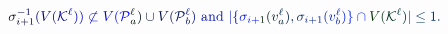 \documentclass[12pt]{article}
\begin{document}
\makeatletter
\renewcommand*{\@textcolor}[3]{%
  \protect\leavevmode
  \begingroup
    \color#1{#2}#3%
  \endgroup
}
\makeatother
\begin{displaymath}
\mathcolor[RGB]{0,0,15}{\sigma} _ { \mathcolor[RGB]{0,0,30}{i} \mathcolor[RGB]{0,0,45}{+} \mathcolor[RGB]{0,0,60}{1} } ^ { \mathcolor[RGB]{0,0,75}{-} \mathcolor[RGB]{0,0,90}{1} } \mathcolor[RGB]{0,0,105}{(} \mathcolor[RGB]{0,0,120}{V} \mathcolor[RGB]{0,0,135}{(} \mathcal { \mathcolor[RGB]{0,0,150}{K} } ^ { \mathcolor[RGB]{0,0,165}{\ell} } \mathcolor[RGB]{0,0,180}{)} \mathcolor[RGB]{0,0,195}{)} \mathcolor[RGB]{0,0,210}{\not\subset} \mathcolor[RGB]{0,0,225}{V} \mathcolor[RGB]{0,0,240}{(} \mathcal { \mathcolor[RGB]{0,0,255}{P} } _ { \mathcolor[RGB]{0,15,0}{a} } ^ { \mathcolor[RGB]{0,15,15}{\ell} } \mathcolor[RGB]{0,15,30}{)} \mathcolor[RGB]{0,15,45}{\cup} \mathcolor[RGB]{0,15,60}{V} \mathcolor[RGB]{0,15,75}{(} \mathcal { \mathcolor[RGB]{0,15,90}{P} } _ { \mathcolor[RGB]{0,15,105}{b} } ^ { \mathcolor[RGB]{0,15,120}{\ell} } \mathcolor[RGB]{0,15,135}{)} \mathrm { ~ \mathcolor[RGB]{0,15,150}{a} \mathcolor[RGB]{0,15,165}{n} \mathcolor[RGB]{0,15,180}{d} ~ } \mathcolor[RGB]{0,15,195}{|} \mathcolor[RGB]{0,15,210}{\{} \mathcolor[RGB]{0,15,225}{\sigma} _ { \mathcolor[RGB]{0,15,240}{i} \mathcolor[RGB]{0,15,255}{+} \mathcolor[RGB]{0,30,0}{1} } \mathcolor[RGB]{0,30,15}{(} \mathcolor[RGB]{0,30,30}{v} _ { \mathcolor[RGB]{0,30,45}{a} } ^ { \mathcolor[RGB]{0,30,60}{\ell} } \mathcolor[RGB]{0,30,75}{)} \mathcolor[RGB]{0,30,90}{,} \mathcolor[RGB]{0,30,105}{\sigma} _ { \mathcolor[RGB]{0,30,120}{i} \mathcolor[RGB]{0,30,135}{+} \mathcolor[RGB]{0,30,150}{1} } \mathcolor[RGB]{0,30,165}{(} \mathcolor[RGB]{0,30,180}{v} _ { \mathcolor[RGB]{0,30,195}{b} } ^ { \mathcolor[RGB]{0,30,210}{\ell} } \mathcolor[RGB]{0,30,225}{)} \mathcolor[RGB]{0,30,240}{\}} \mathcolor[RGB]{0,30,255}{\cap} \mathcolor[RGB]{0,45,0}{V} \mathcolor[RGB]{0,45,15}{(} \mathcal { \mathcolor[RGB]{0,45,30}{K} } ^ { \mathcolor[RGB]{0,45,45}{\ell} } \mathcolor[RGB]{0,45,60}{)} \mathcolor[RGB]{0,45,75}{|} \mathcolor[RGB]{0,45,90}{\leq} \mathcolor[RGB]{0,45,105}{1} \mathcolor[RGB]{0,45,120}{.}
\end{displaymath}
\end{document}
